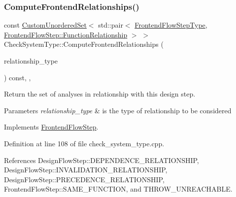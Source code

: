 \subsubsection{\texorpdfstring{Compute\+Frontend\+Relationships()}{ComputeFrontendRelationships()}}
{\footnotesize\ttfamily const \hyperlink{classCustomUnorderedSet}{Custom\+Unordered\+Set}$<$ std\+::pair$<$ \hyperlink{frontend__flow__step_8hpp_afeb3716c693d2b2e4ed3e6d04c3b63bb}{Frontend\+Flow\+Step\+Type}, \hyperlink{classFrontendFlowStep_af7cf30f2023e5b99e637dc2058289ab0}{Frontend\+Flow\+Step\+::\+Function\+Relationship} $>$ $>$ Check\+System\+Type\+::\+Compute\+Frontend\+Relationships (\begin{DoxyParamCaption}\item[{const \hyperlink{classDesignFlowStep_a723a3baf19ff2ceb77bc13e099d0b1b7}{Design\+Flow\+Step\+::\+Relationship\+Type}}]{relationship\+\_\+type }\end{DoxyParamCaption}) const\hspace{0.3cm}{\ttfamily [override]}, {\ttfamily [private]}, {\ttfamily [virtual]}}



Return the set of analyses in relationship with this design step. 


\begin{DoxyParams}{Parameters}
{\em relationship\+\_\+type} & is the type of relationship to be considered \\
\hline
\end{DoxyParams}


Implements \hyperlink{classFrontendFlowStep_abeaff70b59734e462d347ed343dd700d}{Frontend\+Flow\+Step}.



Definition at line 108 of file check\+\_\+system\+\_\+type.\+cpp.



References Design\+Flow\+Step\+::\+D\+E\+P\+E\+N\+D\+E\+N\+C\+E\+\_\+\+R\+E\+L\+A\+T\+I\+O\+N\+S\+H\+IP, Design\+Flow\+Step\+::\+I\+N\+V\+A\+L\+I\+D\+A\+T\+I\+O\+N\+\_\+\+R\+E\+L\+A\+T\+I\+O\+N\+S\+H\+IP, Design\+Flow\+Step\+::\+P\+R\+E\+C\+E\+D\+E\+N\+C\+E\+\_\+\+R\+E\+L\+A\+T\+I\+O\+N\+S\+H\+IP, Frontend\+Flow\+Step\+::\+S\+A\+M\+E\+\_\+\+F\+U\+N\+C\+T\+I\+ON, and T\+H\+R\+O\+W\+\_\+\+U\+N\+R\+E\+A\+C\+H\+A\+B\+LE.

\mbox{\label{classCheckSystemType_a8797397119d638dd0002102672096343}} 
